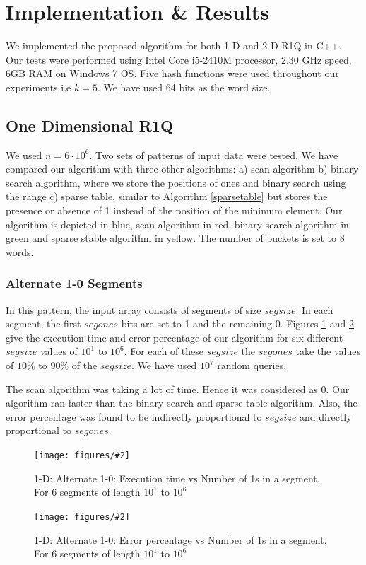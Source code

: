 \documentclass{article}
\newcommand{\addpicture}[4]
{ \begin{figure}[H] \centering \texttt{[image: figures/\#2]} \caption{#4} \label{#3}  \end{figure} }
\begin{document}
\section{Implementation \& Results}
We implemented the proposed algorithm for both 1-D and 2-D R1Q in C++. Our tests were performed using Intel Core i5-2410M processor, 2.30 GHz speed, 6GB RAM on Windows 7 OS. Five hash functions were used throughout our experiments i.e $k = 5$. We have used 64 bits as the word size.

\subsection{One Dimensional R1Q}
We used $n = 6 \cdot 10^6$. Two sets of patterns of input data were tested. We have compared our algorithm with three other algorithms: a) scan algorithm b) binary search algorithm, where we store the positions of ones and binary search using the range c) sparse table, similar to Algorithm \ref{sparsetable} but stores the presence or absence of 1 instead of the position of the minimum element. Our algorithm is depicted in blue, scan algorithm in red, binary search algorithm in green and sparse stable algorithm in yellow. The number of buckets is set to 8 words.

\subsubsection{Alternate 1-0 Segments}
In this pattern, the input array consists of segments of size $segsize$. In each segment, the first $segones$ bits are set to 1 and the remaining 0. Figures \ref{alterexec} and \ref{altererr} give the execution time and error percentage of our algorithm for six different $segsize$ values of $10^1$ to $10^6$. For each of these $segsize$ the $segones$ take the values of $10\%$ to $90\%$ of the $segsize$. We have used $10^7$ random queries.

The scan algorithm was taking a lot of time. Hence it was considered as 0. Our algorithm ran faster than the binary search and sparse table algorithm. Also, the error percentage was found to be indirectly proportional to $segsize$ and directly proportional to $segones$.
\addpicture{width=4.7in}{1dalternate10exec.png}{alterexec}{1-D: Alternate 1-0: Execution time vs Number of 1s in a segment. For 6 segments of length $10^1$ to $10^6$}
\addpicture{width=4.7in}{1dalternate10err.png}{altererr}{1-D: Alternate 1-0: Error percentage vs Number of 1s in a segment. For 6 segments of length $10^1$ to $10^6$}
\end{document}
